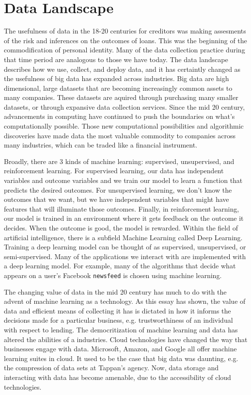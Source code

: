 \section{Data Landscape}
The usefulness of data in the 18-20 centuries for creditors was making
assesments of the risk and inferences on the outcomes of loans. This was the
beginning of the commodification of personal identity. Many of the data
collection practice during that time period are analogous to those we have today.
The data landscape describes how we use, collect, and deploy data, and it has
certaintly changed as the usefulness of
big data %
has expanded across
industries. Big data are high dimensional, large datasets that are becoming increasingly common
assets to many companies. These datasets are aquired through purchasing many smaller
datasets, or through expansive data collection services.
Since the mid 20 century, advancements in computing have
continued to push the boundaries on what's computationally possible. Those new
computational possibilities and algorithmic discoveries have made data the most
valuable commodity to companies across many industries, which can be traded
like a financial instrument.

Broadly, there are 3 kinds of machine learning: supervised, unsupervised, and
reinforcement learning. For supervised learning, our data has independent
variables and outcome variables and we train our model to learn a function that
predicts the desired outcomes. For unsupervised learning, we don't know the
outcomes that we want, but we have independent variables that might have
features that will illuminate those outcomes. Finally, in reinforcement
learning, our model is trained in an environment where it gets feedback on the
outcome it decides. When the outcome is good, the model is rewarded.
Within the field of artificial intelligence, there is a subfield Machine Learning called Deep Learning.
Training a deep learning model can be thought of as supervised, unsupervised, or
semi-supervised. Many of the applications we interact with are implemented with
a deep learning model. For example, many of the algorithms that decide what
appears on a user's Facebook \texttt{newsfeed} is chosen using machine learning.

The changing value of data in the mid 20 century has much to do with the
advent of machine learning as a technology. As this essay has shown, the value
of data and efficient means of collecting it has is dictated in how it informs
the decisions made for a particular business, e.g. trustworthiness of an
individual with respect to lending. The democritization of machine learning and
data has altered the abilities of a industries. Cloud technologies have changed
the way that businesses engage with data. Microsoft, Amazon, and Google all
offer machine learning suites in cloud. It used to be the case that big data
was daunting, e.g. the compression of data sets at Tappan's agency.
Now, data storage and interacting with data has become amenable,
due to the accessibility of cloud technologies.

